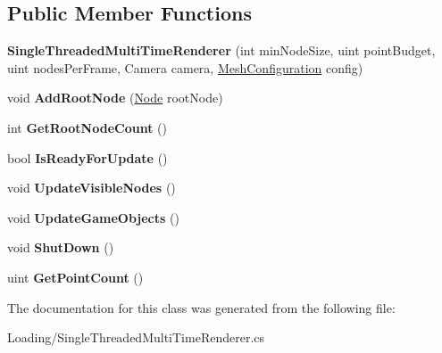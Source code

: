 \subsection*{Public Member Functions}
\begin{DoxyCompactItemize}
\item 
\mbox{\label{class_loading_1_1_single_threaded_multi_time_renderer_a649c7e2dade5367b325247c8e52dd6cb}} 
{\bfseries Single\+Threaded\+Multi\+Time\+Renderer} (int min\+Node\+Size, uint point\+Budget, uint nodes\+Per\+Frame, Camera camera, \hyperlink{class_object_creation_1_1_mesh_configuration}{Mesh\+Configuration} config)
\item 
\mbox{\label{class_loading_1_1_single_threaded_multi_time_renderer_acac293127e86bf366b8f6f1fcf0fcb8d}} 
void {\bfseries Add\+Root\+Node} (\hyperlink{class_cloud_data_1_1_node}{Node} root\+Node)
\item 
\mbox{\label{class_loading_1_1_single_threaded_multi_time_renderer_aac03e886194621b06aee2661a556e199}} 
int {\bfseries Get\+Root\+Node\+Count} ()
\item 
\mbox{\label{class_loading_1_1_single_threaded_multi_time_renderer_a388989b16b51b2facbbd9384ebf42bdd}} 
bool {\bfseries Is\+Ready\+For\+Update} ()
\item 
\mbox{\label{class_loading_1_1_single_threaded_multi_time_renderer_aa9085a1fcd401178f9ad7f091c636c52}} 
void {\bfseries Update\+Visible\+Nodes} ()
\item 
\mbox{\label{class_loading_1_1_single_threaded_multi_time_renderer_a67525443650af03f6d9a992ca6268e9c}} 
void {\bfseries Update\+Game\+Objects} ()
\item 
\mbox{\label{class_loading_1_1_single_threaded_multi_time_renderer_a4ae66f4ef13754c92fb3313e8eb60cb6}} 
void {\bfseries Shut\+Down} ()
\item 
\mbox{\label{class_loading_1_1_single_threaded_multi_time_renderer_aa2a4d051b7d089ae7d57ca19a0e157e0}} 
uint {\bfseries Get\+Point\+Count} ()
\end{DoxyCompactItemize}


The documentation for this class was generated from the following file\+:\begin{DoxyCompactItemize}
\item 
Loading/Single\+Threaded\+Multi\+Time\+Renderer.\+cs\end{DoxyCompactItemize}

